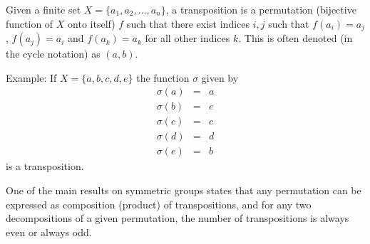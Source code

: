 \documentclass[12pt]{article}
\begin{document}
Given a finite set $X=\{a_1,a_2,\ldots,a_n\}$, a transposition is a permutation (bijective function of $X$ onto itself) $f$ such that there exist indices $i,j$ such that
$f(a_i)=a_j$, $f(a_j)=a_i$ and $f(a_k)=a_k$ for all other indices $k$. This is often denoted (in the cycle notation) as $(a, b)$.

Example:
If $X=\{a,b,c,d,e\}$ the function $\sigma$ given by
\begin{eqnarray*}
\sigma(a)&=&a\\
\sigma(b)&=&e\\
\sigma(c)&=&c\\
\sigma(d)&=&d\\
\sigma(e)&=&b
\end{eqnarray*}
is a transposition.

One of the main results on symmetric groups states that any permutation can be expressed as composition (product) of transpositions, and for any two decompositions of a given permutation, the number of transpositions is always even or always odd.
\end{document}
